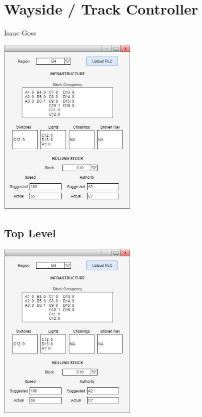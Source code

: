 \documentclass{scrreprt}
\begin{document}


\chapter{Wayside / Track Controller}
\Large{Isaac Goss}\\
\begin{center}
    \includegraphics[width=0.5\textwidth]{wc-ui}
\end{center}



\section{Top Level}
\begin{center}
    \includegraphics[trim = {.0 7.7cm 0cm 0cm }, clip, width=0.5\textwidth]{wc-ui}
\end{center}
\end{document}
